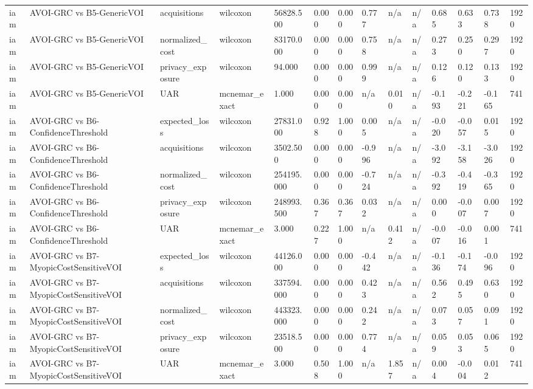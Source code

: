 \begin{table}[!ht]
{\begin{tabular}{llllllllllllll}
iam & AVOI-GRC vs B5-GenericVOI & acquisitions & wilcoxon & 56828.500 & 0.000 & 0.000 & 0.777 & n/a & n/a & 0.685 & 0.633 & 0.738 & 1920 \\
iam & AVOI-GRC vs B5-GenericVOI & normalized\_cost & wilcoxon & 83170.000 & 0.000 & 0.000 & 0.758 & n/a & n/a & 0.273 & 0.250 & 0.297 & 1920 \\
iam & AVOI-GRC vs B5-GenericVOI & privacy\_exposure & wilcoxon & 94.000 & 0.000 & 0.000 & 0.999 & n/a & n/a & 0.126 & 0.120 & 0.133 & 1920 \\
iam & AVOI-GRC vs B5-GenericVOI & UAR & mcnemar\_exact & 1.000 & 0.000 & 0.000 & n/a & 0.010 & n/a & -0.193 & -0.221 & -0.165 & 741 \\
iam & AVOI-GRC vs B6-ConfidenceThreshold & expected\_loss & wilcoxon & 27831.000 & 0.928 & 1.000 & 0.005 & n/a & n/a & -0.020 & -0.057 & 0.015 & 1920 \\
iam & AVOI-GRC vs B6-ConfidenceThreshold & acquisitions & wilcoxon & 3502.500 & 0.000 & 0.000 & -0.996 & n/a & n/a & -3.092 & -3.158 & -3.026 & 1920 \\
iam & AVOI-GRC vs B6-ConfidenceThreshold & normalized\_cost & wilcoxon & 254195.000 & 0.000 & 0.000 & -0.724 & n/a & n/a & -0.392 & -0.419 & -0.365 & 1920 \\
iam & AVOI-GRC vs B6-ConfidenceThreshold & privacy\_exposure & wilcoxon & 248993.500 & 0.367 & 0.367 & 0.032 & n/a & n/a & 0.000 & -0.007 & 0.007 & 1920 \\
iam & AVOI-GRC vs B6-ConfidenceThreshold & UAR & mcnemar\_exact & 3.000 & 0.227 & 1.000 & n/a & 0.412 & n/a & -0.007 & -0.016 & 0.001 & 741 \\
iam & AVOI-GRC vs B7-MyopicCostSensitiveVOI & expected\_loss & wilcoxon & 44126.000 & 0.000 & 0.000 & -0.442 & n/a & n/a & -0.136 & -0.174 & -0.096 & 1920 \\
iam & AVOI-GRC vs B7-MyopicCostSensitiveVOI & acquisitions & wilcoxon & 337594.000 & 0.000 & 0.000 & 0.423 & n/a & n/a & 0.562 & 0.495 & 0.630 & 1920 \\
iam & AVOI-GRC vs B7-MyopicCostSensitiveVOI & normalized\_cost & wilcoxon & 443323.000 & 0.000 & 0.000 & 0.242 & n/a & n/a & 0.073 & 0.057 & 0.091 & 1920 \\
iam & AVOI-GRC vs B7-MyopicCostSensitiveVOI & privacy\_exposure & wilcoxon & 23518.500 & 0.000 & 0.000 & 0.774 & n/a & n/a & 0.059 & 0.053 & 0.065 & 1920 \\
iam & AVOI-GRC vs B7-MyopicCostSensitiveVOI & UAR & mcnemar\_exact & 3.000 & 0.508 & 1.000 & n/a & 1.857 & n/a & 0.004 & -0.004 & 0.012 & 741 \\

\end{tabular}}
\end{table}
